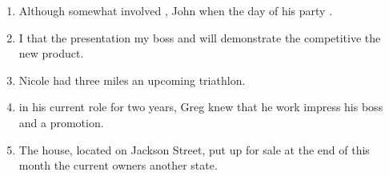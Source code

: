 \begin{enumerate}
\item \begin{inparaenum}[A]
Although  somewhat involved , John  when the day of his party .
\end{inparaenum}

\item \begin{inparaenum}[A]
I  that the presentation  my boss and  will demonstrate the competitive  the new product. 
\end{inparaenum}

\item \begin{inparaenum}[A]
Nicole had  three miles    an upcoming triathlon. 
\end{inparaenum}

\item \begin{inparaenum}[A]
 in his current role for two years, Greg knew that he  work  impress his boss and  a promotion. 
\end{inparaenum}

\item \begin{inparaenum}[A]
The house,  located on Jackson Street,  put up for sale at the end of this month  the current owners  another state. 
\end{inparaenum}


\end{enumerate}
